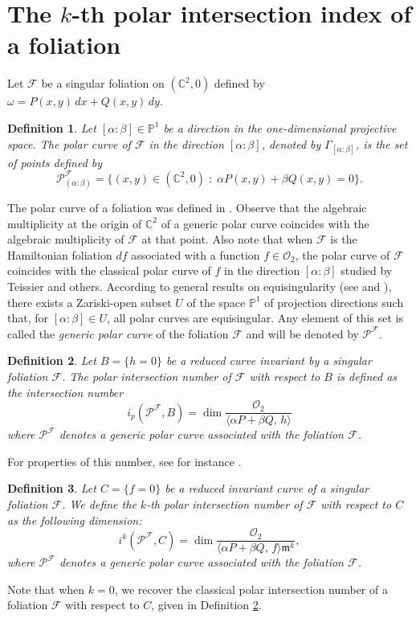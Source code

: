 \documentclass[12pt,letterpaper]{amsart}
\newcommand{\C}{\mathbb{C}}
\newcommand{\F}{\mathcal{F}}
\newcommand{\m}{\mathfrak{m}}
\newtheorem{definition}{Definition}[section]
\begin{document}
\section{The $k$-th polar intersection index of a foliation}\label{polar_section}
Let $\F$ be a singular foliation on $(\C^2,0)$ defined by $\omega=P(x,y)\,dx+Q(x,y)\,dy$.
\begin{definition}
Let $[\alpha:\beta ]\in \mathbb{P}^1$ be a direction in the one-dimensional projective space.  
The \emph{polar curve} of $\mathcal{F}$ in the direction $[\alpha:\beta]$, denoted by $\Gamma_{[\alpha:\beta]}$, is the set of points defined by
\[
\mathcal{P}^{\mathcal{F}}_{(\alpha:\beta)}= \{(x,y)\in(\mathbb{C}^2,0)\;:\;\alpha P(x,y)+\beta Q(x,y)=0\}.
\]
\end{definition}
The polar curve of a foliation was defined in \cite{Cano}. Observe that the algebraic multiplicity at the origin of $\mathbb{C}^2$ of a generic polar curve coincides with the algebraic multiplicity of $\mathcal{F}$ at that point.
Also note that when $\mathcal{F}$ is the Hamiltonian foliation $df$ associated with a function $f\in\mathcal{O}_2$, the polar curve of $\mathcal{F}$ coincides with the classical polar curve of $f$ in the direction $[\alpha:\beta]$ studied by Teissier \cite{Teissier_inv} and others. According to general results on equisingularity (see \cite{Zariski} and \cite{Teissier_polar}), there exists a Zariski-open subset $U$ of the space $\mathbb{P}^1$ of projection directions such that, for $[\alpha:\beta]\in U$, all polar curves are equisingular. Any element of this set is called the {\it generic polar curve} of the foliation $\mathcal{F}$ and will be denoted by $\mathcal{P}^{\mathcal{F}}$.
\begin{definition}\label{defi_polar}
Let $B =\{h = 0\}$ be a reduced curve invariant by a singular foliation $\mathcal{F}$.  
The \emph{polar intersection number} of $\mathcal{F}$ with respect to $B$ is defined as the intersection number
\[
i_p(\mathcal{P}^{\mathcal{F}}, B)= \dim\frac{\mathcal{O}_2}{\langle \alpha P+\beta Q,\,h\rangle}
\]
where $\mathcal{P}^{\mathcal{F}}$ denotes a generic polar curve associated with the foliation $\mathcal{F}$.
\end{definition}
For properties of this number, see for instance \cite[Section 4]{mol2}.
\begin{definition}
Let $C=\{f=0\}$ be a reduced invariant curve of a singular foliation $\mathcal{F}$. We define the {\it $k$-th polar intersection number} of $\mathcal{F}$ with respect to $C$ as the following dimension:
\[
i^{k}(\mathcal{P}^{\mathcal{F}},C)=\dim\frac{\mathcal{O}_2}{\langle \alpha P+\beta Q,\,f\rangle \m^{k}},
\]
where $\mathcal{P}^{\mathcal{F}}$ denotes a generic polar curve associated with the foliation $\mathcal{F}$.
\end{definition}
Note that when $k=0$, we recover the classical polar intersection number of a foliation $\mathcal{F}$ with respect to $C$, given in Definition \ref{defi_polar}. 
\end{document}
